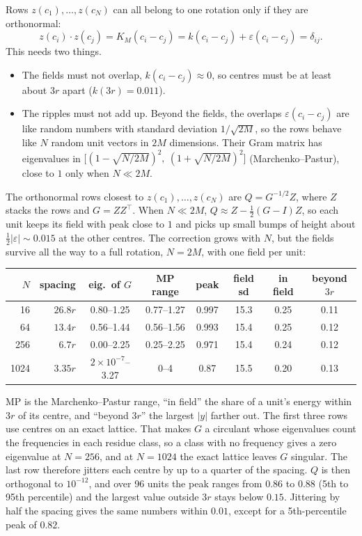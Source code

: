 \documentclass[11pt]{article}
\begin{document}
Rows $z(c_1), \dots, z(c_N)$ can all belong to one rotation only if they are orthonormal:
\begin{equation}
  z(c_i)\cdot z(c_j) = K_M(c_i - c_j) = k(c_i - c_j) + \varepsilon(c_i - c_j) = \delta_{ij}.
\end{equation}
This needs two things.
\begin{itemize}
  \item The fields must not overlap, $k(c_i - c_j) \approx 0$, so centres must be at least about
  $3r$ apart ($k(3r) = 0.011$).
  \item The ripples must not add up. Beyond the fields, the overlaps $\varepsilon(c_i - c_j)$ are
  like random numbers with standard deviation $1/\sqrt{2M}$, so the rows behave like $N$ random
  unit vectors in $2M$ dimensions. Their Gram matrix has eigenvalues in
  $\bigl[(1 - \sqrt{N/2M})^2,\ (1 + \sqrt{N/2M})^2\bigr]$ (Marchenko--Pastur), close to $1$ only
  when $N \ll 2M$.
\end{itemize}
The orthonormal rows closest to $z(c_1), \dots, z(c_N)$ are $Q = G^{-1/2}Z$, where $Z$ stacks the
rows and $G = ZZ^\top$. When $N \ll 2M$, $Q \approx Z - \tfrac12(G - I)Z$, so each unit keeps its
field with peak close to $1$ and picks up small bumps of height about $\tfrac12|\varepsilon| \sim
0.015$ at the other centres. The correction grows with $N$, but the fields survive all the way to a
full rotation, $N = 2M$, with one field per unit:
\begin{center}
\small
\setlength{\tabcolsep}{5pt}
\begin{tabular}{rrcccccc}
  \toprule
  $N$ & spacing & eig.\ of $G$ & MP range & peak & field sd & in field & beyond $3r$ \\
  \midrule
  16 & $26.8r$ & 0.80--1.25 & 0.77--1.27 & 0.997 & 15.3 & 0.25 & 0.11 \\
  64 & $13.4r$ & 0.56--1.44 & 0.56--1.56 & 0.993 & 15.4 & 0.25 & 0.12 \\
  256 & $6.7r$ & 0.00--2.25 & 0.25--2.25 & 0.971 & 15.4 & 0.24 & 0.12 \\
  1024 & $3.35r$ & $2\times10^{-7}$--3.27 & 0--4 & 0.87 & 15.5 & 0.20 & 0.13 \\
  \bottomrule
\end{tabular}
\end{center}
MP is the Marchenko--Pastur range, ``in field'' the share of a unit's energy within $3r$ of its
centre, and ``beyond $3r$'' the largest $|y|$ farther out. The first three rows use centres on an
exact lattice. That makes $G$ a circulant whose eigenvalues
count the frequencies in each residue class, so a class with no frequency gives a zero eigenvalue
at $N = 256$, and at $N = 1024$ the exact lattice leaves $G$ singular. The last row therefore
jitters each centre by up to a quarter of the spacing. $Q$ is then orthogonal to $10^{-12}$, and
over 96 units the peak ranges from $0.86$ to $0.88$ (5th to 95th percentile) and the largest value
outside $3r$ stays below $0.15$. Jittering by half the spacing gives the same numbers within
$0.01$, except for a 5th-percentile peak of $0.82$.
\end{document}

